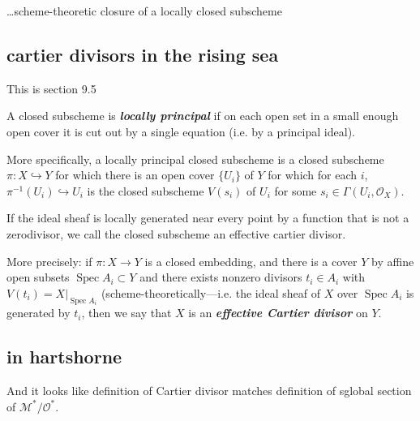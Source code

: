 \begin{defn}\leavevmode

\end{defn}

…scheme-theoretic closure of a locally closed subscheme


\subsection{cartier divisors in the rising sea}

This is section 9.5

A closed subscheme is \textit{\textbf{locally principal}} if on each open set in a small enough open cover it is cut out by a single equation (i.e. by a principal ideal).

More specifically, a locally principal closed subscheme is a closed subscheme \(\pi:X \hookrightarrow Y\) for which there is an open cover \(\{U_i\}\) of \(Y\) for which for each \(i\), \(\pi^{-1}(U_i) \hookrightarrow U_i\) {\color{2}is} the closed subscheme \(V(s_i)\) of \(U_i\) for some \(s_i \in \Gamma(U_i,\mathcal{O}_X)\).

If the ideal sheaf is locally generated near every point by a function that is not a zerodivisor, we call the closed subscheme an effective cartier divisor.

More precisely: if \(\pi:X \to Y\) is a closed embedding, and there is a cover \(Y\) by affine open subsets \(\operatorname{Spec}A_i \subset Y\) and there exists nonzero divisors \(t_i\in A_i\) with  \(V(t_i)=X|_{\operatorname{Spec}A_i}\) (scheme-theoretically---i.e. the ideal sheaf of \(X\) over \(\operatorname{Spec}A_i\) is generated by \(t_i\), then we say that \(X\) is an \textit{\textbf{effective Cartier divisor}} on \(Y\).

\subsection{in hartshorne}

And it looks like \cite{har} definition of Cartier divisor matches \cite{gri} definition of sglobal section of \(\mathcal{M}^*/\mathcal{O}^*\).

